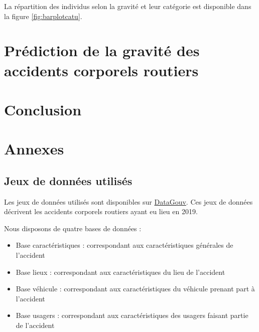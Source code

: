 \documentclass[french,]{tp}
\providecommand{\tightlist}{%
  \setlength{\itemsep}{0pt}\setlength{\parskip}{0pt}}
\begin{document}
La répartition des individus selon la gravité et leur catégorie est disponible dans la figure \ref{fig:barplotcatu}.

\hypertarget{pruxe9diction-de-la-gravituxe9-des-accidents-corporels-routiers}{%
\section{Prédiction de la gravité des accidents corporels routiers}\label{pruxe9diction-de-la-gravituxe9-des-accidents-corporels-routiers}}

\newpage

\hypertarget{conclusion}{%
\section{Conclusion}\label{conclusion}}

\newpage

\hypertarget{appendix-annexes}{%
\appendix}


\hypertarget{annexes}{%
\section{Annexes}\label{annexes}}

\hypertarget{jeux-donnees}{%
\subsection{Jeux de données utilisés}\label{jeux-donnees}}

Les jeux de données utilisés sont disponibles sur \href{https://www.data.gouv.fr/fr/datasets/bases-de-donnees-annuelles-des-accidents-corporels-de-la-circulation-routiere-annees-de-2005-a-2019/}{DataGouv}. Ces jeux de données décrivent les accidents corporels routiers ayant eu lieu en 2019.

Nous disposons de quatre bases de données :

\begin{itemize}
\tightlist
\item
  Base caractéristiques : correspondant aux caractéristiques générales de l'accident
\item
  Base lieux : correspondant aux caractéristiques du lieu de l'accident
\item
  Base véhicule : correspondant aux caractéristiques du véhicule prenant part à l'accident
\item
  Base usagers : correspondant aux caractéristiques des usagers faisant partie de l'accident
\end{itemize}
\end{document}
